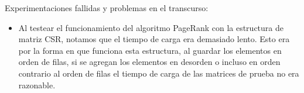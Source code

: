 Experimentaciones fallidas y problemas en el transcurso:
\begin{itemize}
\item Al testear el funcionamiento del algoritmo PageRank con la estructura de matriz CSR, notamos que el tiempo de carga era demasiado lento. Esto era por la forma en que funciona esta estructura, al guardar los elementos en orden de filas, si se agregan los elementos en desorden o incluso en orden contrario al orden de filas el tiempo de carga de las matrices de prueba no era razonable.
\end{itemize}
